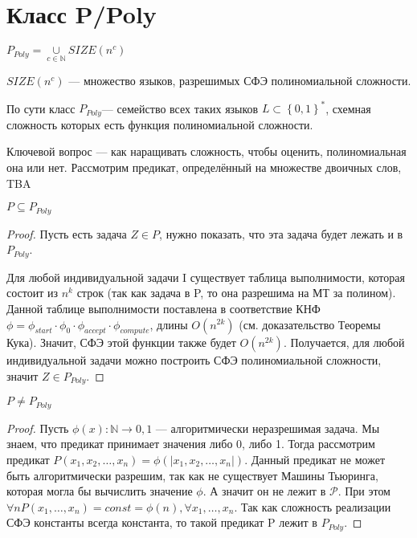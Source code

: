 \section{Класс P/Poly}

\begin{definition}
	$P_{Poly} = \cup\limits_{c\in \mathbb{N}} SIZE(n^c) $
\end{definition}
$SIZE(n^c)$ --- множество языков, разрешимых СФЭ полиномиальной сложности.

По сути класс $P_{Poly}$--- семейство всех таких языков $L \subset \left\{ 0,1
\right\}^* $, схемная сложность которых есть функция полиномиальной сложности.

Ключевой вопрос --- как наращивать сложность, чтобы оценить, полиномиальная она
или нет. Рассмотрим предикат, определённый на множестве двоичных слов, TBA


\begin{theorem}
	$P\subseteq P_{Poly}$
\end{theorem}
\begin{proof}
	Пусть есть задача $Z \in P$, нужно показать, что эта задача будет лежать
	и в  $P_{Poly}$.

	Для любой индивидуальной задачи I существует таблица выполнимости,
	которая состоит из  $n^k$ строк (так как задача в P, то она разрешима на
	МТ за полином). Данной таблице выполнимости поставлена в соответствие
	КНФ $\phi = \phi_{start}\cdot \phi_0 \cdot \phi_{accept} \cdot
	\phi_{compute}$, длины $O(n^{2k})$ (см. доказательство Теоремы Кука).
	Значит, СФЭ этой функции также будет
	$O(n^{2k})$. Получается, для любой индивидуальной задачи можно построить
	СФЭ полиномиальной сложности, значит $Z\in P_{Poly}$.
\end{proof}
\begin{theorem}
	$P \not = P_{Poly}$
\end{theorem}
\begin{proof}
	Пусть $\phi(x): \mathbb{N} \to {0, 1}$ --- алгоритмически неразрешимая
	задача. Мы знаем, что предикат принимает значения либо 0, либо 1. Тогда
	рассмотрим предикат $P(x_1, x_2,\ldots, x_n) = \phi(\left| x_1, x_2,
	\ldots, x_n \right| )$. Данный предикат не может быть алгоритмически
	разрешим, так как не существует Машины Тьюринга, которая могла бы
	вычислить значение $\phi$. А значит он не лежит в $\mathcal{P}$. При этом  $\forall n P(x_1, \ldots, x_n) =
	const = \phi (n), \forall x_1, \ldots, x_n$. Так как сложность
	реализации СФЭ константы всегда константа, то такой предикат P лежит в
	$P_{Poly}$.
\end{proof}

